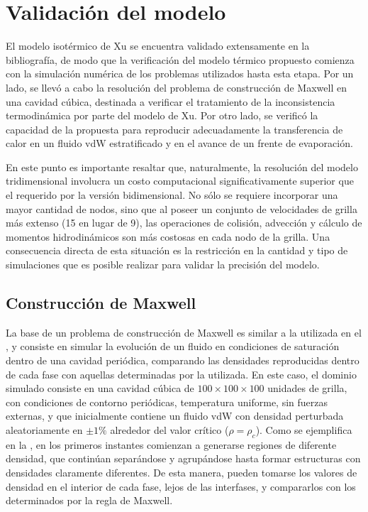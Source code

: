 \section{Validaci\'on del modelo}

El modelo isot\'ermico de Xu  se encuentra validado extensamente en la bibliograf\'ia, de modo que la verificaci\'on del modelo t\'ermico propuesto comienza con la simulaci\'on num\'erica de los problemas utilizados hasta esta etapa. Por un lado, se llev\'o a cabo la resoluci\'on del problema de construcci\'on de Maxwell en una cavidad c\'ubica, destinada a verificar el tratamiento de la inconsistencia termodin\'amica por parte del modelo de Xu. Por otro lado, se verific\'o la capacidad de la \lbe{} propuesta para reproducir adecuadamente la transferencia de calor en un fluido vdW estratificado y en el avance de un frente de evaporaci\'on.

En este punto es importante resaltar que, naturalmente, la resoluci\'on del modelo tridimensional involucra un costo computacional significativamente superior que el requerido por la versi\'on bidimensional. No s\'olo se requiere incorporar una mayor cantidad de nodos, sino que al poseer un conjunto de velocidades de grilla m\'as extenso (15 en lugar de 9), las operaciones de colisi\'on, advecci\'on y c\'alculo de momentos hidrodin\'amicos son m\'as costosas en cada nodo de la grilla. Una consecuencia directa de esta situaci\'on es la restricci\'on en la cantidad y tipo de simulaciones que es posible realizar para validar la precisi\'on del modelo. 


\subsection{Construcci\'on de Maxwell} 

La base de un problema de construcci\'on de Maxwell es similar a la utilizada en el , y consiste en simular la evoluci\'on de un fluido en condiciones de saturaci\'on dentro de una cavidad peri\'odica, comparando las densidades reproducidas dentro de cada fase con aquellas determinadas por la \eos{} utilizada. En este caso, el dominio simulado consiste en una cavidad c\'ubica de $100 \times 100 \times 100$ unidades de grilla, con condiciones de contorno peri\'odicas, temperatura uniforme, sin fuerzas externas, y que inicialmente contiene un fluido vdW con densidad perturbada aleatoriamente en  $\pm 1\%$ alrededor del valor cr\'itico ($\rho=\rho_c$). Como se ejemplifica en la , en los primeros instantes comienzan a generarse regiones de diferente densidad, que contin\'uan separ\'andose y agrup\'andose hasta formar estructuras con densidades claramente diferentes. De esta manera, pueden tomarse los valores de densidad en el interior de cada fase, lejos de las interfases, y compararlos con los determinados por la regla de Maxwell.

